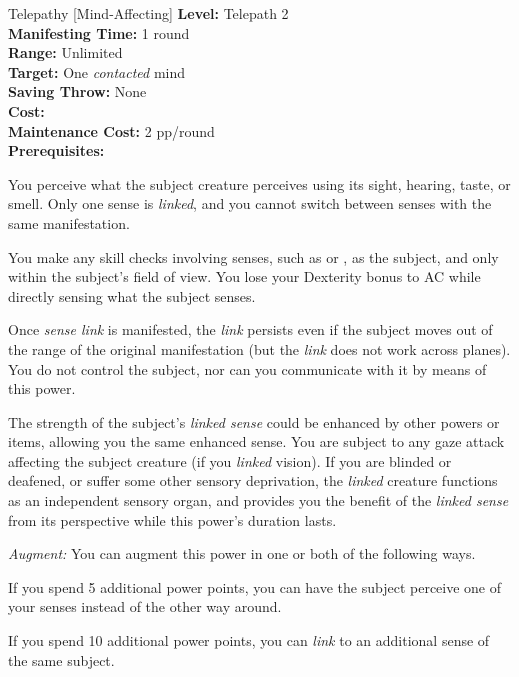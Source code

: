 {Telepathy [Mind-Affecting]}
{
	\textbf{Level:}
	Telepath 2\\
	\textbf{Manifesting Time:}
	1 round\\
	\textbf{Range:}
	Unlimited\\
	\textbf{Target:}
	One \emph{contacted} mind\\
	\textbf{Saving Throw:}
	None\\
	\textbf{Cost:}
	\\
	\textbf{Maintenance Cost:}
	2 pp/round\\
	\textbf{Prerequisites:}
	\\
}
{
	You perceive what the subject creature perceives using its sight, hearing, taste, or smell. Only one sense is \emph{linked}, and you cannot switch between senses with the same manifestation.

	You make any skill checks involving senses, such as  or , as the subject, and only within the subject's field of view. You lose your Dexterity bonus to AC while directly sensing what the subject senses.

	Once \emph{sense link} is manifested, the \emph{link} persists even if the subject moves out of the range of the original manifestation (but the \emph{link} does not work across planes). You do not control the subject, nor can you communicate with it by means of this power.

	The strength of the subject's \emph{linked sense} could be enhanced by other powers or items, allowing you the same enhanced sense. You are subject to any gaze attack affecting the subject creature (if you \emph{linked} vision). If you are blinded or deafened, or suffer some other sensory deprivation, the \emph{linked} creature functions as an independent sensory organ, and provides you the benefit of the \emph{linked sense} from its perspective while this power's duration lasts.

	\textit{Augment:} You can augment this power in one or both of the following ways.
	\begin{enumerate*}
	\item If you spend 5 additional power points, you can have the subject perceive one of your senses instead of the other way around.
	\item If you spend 10 additional power points, you can \emph{link} to an additional sense of the same subject.
	\end{enumerate*}
}
